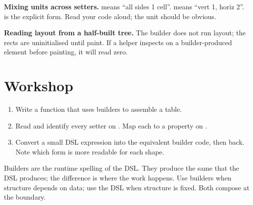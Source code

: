 \begin{warning}
\textbf{Mixing units across setters.}  means
``all sides 1 cell''.  means ``vert 1, horiz
2''.  is the explicit
form. Read your code aloud; the unit should be obvious.
\end{warning}

\begin{warning}
\textbf{Reading layout from a half-built tree.} The builder does
not run layout; the rects are uninitialised until paint. If a
helper inspects  on a builder-produced element
before painting, it will read zero.
\end{warning}

\section*{Workshop}

\begin{enumerate}[leftmargin=*]
  \item Write a function  that uses
    builders to assemble a table.
  \item Read
     and identify
    every setter on . Map each to a property
    on .
  \item Convert a small DSL expression into the equivalent
    builder code, then back. Note which form is more readable
    for each shape.
\end{enumerate}

\begin{recap}
Builders are the runtime spelling of the DSL. They produce the
same  that the DSL produces; the difference is
where the work happens. Use builders when structure depends on
data; use the DSL when structure is fixed. Both compose at the
 boundary.
\end{recap}
